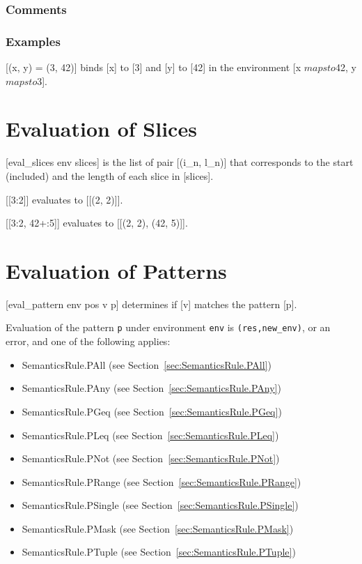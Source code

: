 \documentclass{book}
\begin{document}
    \subsection{Comments}

    \subsection{Examples}
    [(x, y) = (3, 42)] binds [x] to [3] and [y] to [42] in the environment [x $mapsto$42, y $mapsto$3].

\chapter{Evaluation of Slices \label{chap:eval_slices}}
[eval\_slices env slices] is the list of pair [(i\_n, l\_n)] that
corresponds to the start (included) and the length of each slice in
[slices].

[[3:2]] evaluates to [[(2, 2)]].

[[3:2, 42+:5]] evaluates to [[(2, 2), (42, 5)]].

\chapter{Evaluation of Patterns \label{chap:eval_pattern}}
[eval\_pattern env pos v p] determines if [v] matches the pattern [p].

Evaluation of the pattern \texttt{p} under environment \texttt{env} is
\texttt{(res,new\_env)}, or an error, and one of the following applies:
\begin{itemize}
\item SemanticsRule.PAll (see Section~\ref{sec:SemanticsRule.PAll})
\item SemanticsRule.PAny (see Section~\ref{sec:SemanticsRule.PAny})
\item SemanticsRule.PGeq (see Section~\ref{sec:SemanticsRule.PGeq})
\item SemanticsRule.PLeq (see Section~\ref{sec:SemanticsRule.PLeq})
\item SemanticsRule.PNot (see Section~\ref{sec:SemanticsRule.PNot})
\item SemanticsRule.PRange (see Section~\ref{sec:SemanticsRule.PRange})
\item SemanticsRule.PSingle (see Section~\ref{sec:SemanticsRule.PSingle})
\item SemanticsRule.PMask (see Section~\ref{sec:SemanticsRule.PMask})
\item SemanticsRule.PTuple (see Section~\ref{sec:SemanticsRule.PTuple})
\end{itemize}
\end{document}
